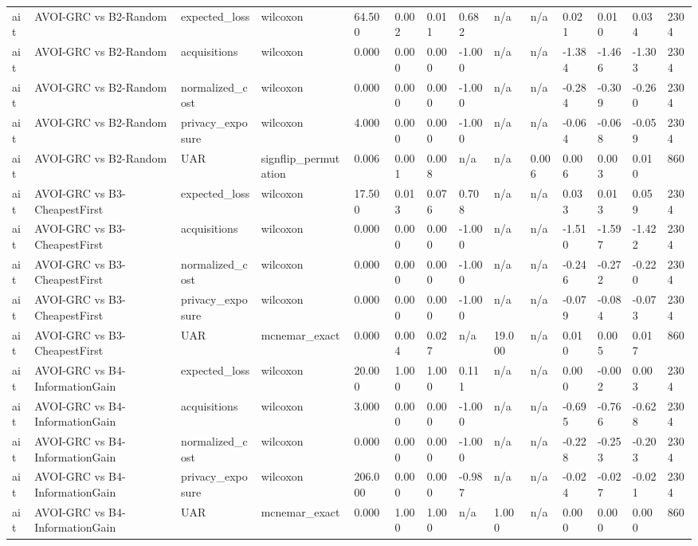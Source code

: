 \begin{table}[!ht]
{\begin{tabular}{llllllllllllll}
ait & AVOI-GRC vs B2-Random & expected\_loss & wilcoxon & 64.500 & 0.002 & 0.011 & 0.682 & n/a & n/a & 0.021 & 0.010 & 0.034 & 2304 \\
ait & AVOI-GRC vs B2-Random & acquisitions & wilcoxon & 0.000 & 0.000 & 0.000 & -1.000 & n/a & n/a & -1.384 & -1.466 & -1.303 & 2304 \\
ait & AVOI-GRC vs B2-Random & normalized\_cost & wilcoxon & 0.000 & 0.000 & 0.000 & -1.000 & n/a & n/a & -0.284 & -0.309 & -0.260 & 2304 \\
ait & AVOI-GRC vs B2-Random & privacy\_exposure & wilcoxon & 4.000 & 0.000 & 0.000 & -1.000 & n/a & n/a & -0.064 & -0.068 & -0.059 & 2304 \\
ait & AVOI-GRC vs B2-Random & UAR & signflip\_permutation & 0.006 & 0.001 & 0.008 & n/a & n/a & 0.006 & 0.006 & 0.003 & 0.010 & 860 \\
ait & AVOI-GRC vs B3-CheapestFirst & expected\_loss & wilcoxon & 17.500 & 0.013 & 0.076 & 0.708 & n/a & n/a & 0.033 & 0.013 & 0.059 & 2304 \\
ait & AVOI-GRC vs B3-CheapestFirst & acquisitions & wilcoxon & 0.000 & 0.000 & 0.000 & -1.000 & n/a & n/a & -1.510 & -1.597 & -1.422 & 2304 \\
ait & AVOI-GRC vs B3-CheapestFirst & normalized\_cost & wilcoxon & 0.000 & 0.000 & 0.000 & -1.000 & n/a & n/a & -0.246 & -0.272 & -0.220 & 2304 \\
ait & AVOI-GRC vs B3-CheapestFirst & privacy\_exposure & wilcoxon & 0.000 & 0.000 & 0.000 & -1.000 & n/a & n/a & -0.079 & -0.084 & -0.073 & 2304 \\
ait & AVOI-GRC vs B3-CheapestFirst & UAR & mcnemar\_exact & 0.000 & 0.004 & 0.027 & n/a & 19.000 & n/a & 0.010 & 0.005 & 0.017 & 860 \\
ait & AVOI-GRC vs B4-InformationGain & expected\_loss & wilcoxon & 20.000 & 1.000 & 1.000 & 0.111 & n/a & n/a & 0.000 & -0.002 & 0.003 & 2304 \\
ait & AVOI-GRC vs B4-InformationGain & acquisitions & wilcoxon & 3.000 & 0.000 & 0.000 & -1.000 & n/a & n/a & -0.695 & -0.766 & -0.628 & 2304 \\
ait & AVOI-GRC vs B4-InformationGain & normalized\_cost & wilcoxon & 0.000 & 0.000 & 0.000 & -1.000 & n/a & n/a & -0.228 & -0.253 & -0.203 & 2304 \\
ait & AVOI-GRC vs B4-InformationGain & privacy\_exposure & wilcoxon & 206.000 & 0.000 & 0.000 & -0.987 & n/a & n/a & -0.024 & -0.027 & -0.021 & 2304 \\
ait & AVOI-GRC vs B4-InformationGain & UAR & mcnemar\_exact & 0.000 & 1.000 & 1.000 & n/a & 1.000 & n/a & 0.000 & 0.000 & 0.000 & 860 \\

\end{tabular}}
\end{table}
